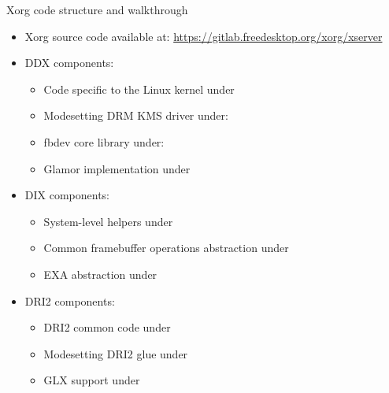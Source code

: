 \begin{frame}{Xorg code structure and walkthrough}
  \begin{itemize}
  \item Xorg source code available at: \url{https://gitlab.freedesktop.org/xorg/xserver}
  \item DDX components:
    \begin{itemize}
    \item Code specific to the Linux kernel under 
    \item Modesetting DRM KMS driver under: 
    \item fbdev core library under: 
    \item Glamor implementation under 
    \end{itemize}
  \item DIX components:
    \begin{itemize}
    \item System-level helpers under 
    \item Common framebuffer operations abstraction under 
    \item EXA abstraction under 
    \end{itemize}
  \item DRI2 components:
    \begin{itemize}
    \item DRI2 common code under 
    \item Modesetting DRI2 glue under 
    \item GLX support under 
    \end{itemize}
  \end{itemize}
\end{frame}

